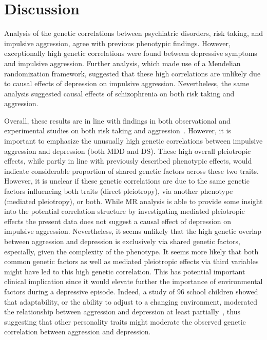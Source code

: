 \section{Discussion}
\label{sec:discussion_ukb_psych}

Analysis of the genetic correlations between psychiatric disorders, risk taking, and impulsive aggression, agree with previous phenotypic findings.
However, exceptionally high genetic correlations were found between depressive symptoms and impulsive aggression.
Further analysis, which made use of a Mendelian randomization framework, suggested that these high correlations are unlikely due to causal effects of depression on impulsive aggression.
Nevertheless, the same analysis suggested causal effects of schizophrenia on both risk taking and aggression. 

Overall, these results are in line with findings in both observational and experimental studies on both risk taking and aggression~\cite{Ballester2012,Ouzir2013,Hoptman2015,Sher2005,Roland2002,Taft2009, Dutton2013}.
However, it is important to emphasize the unusually high genetic correlations between impulsive aggression and depression (both MDD and DS).  
These high overall pleiotropic effects, while partly in line with previously described phenotypic effects, would indicate considerable proportion of shared genetic factors across these two traits.
However, it is unclear if these genetic correlations are due to the same genetic factors influencing both traits (direct pleiotropy), via another phenotype (mediated pleiotropy), or both.
While MR analysis is able to provide some insight into the potential correlation structure by investigating mediated pleiotropic effects the present data does not suggest a causal effect of depression on impulsive aggression.
Nevertheless, it seems unlikely that the high genetic overlap between aggression and depression is exclusively via shared genetic factors,
especially, given the complexity of the phenotype.
It seems more likely that both common genetic factors as well as mediated pleiotropic effects via third variables might have led to this high genetic correlation.
This has potential important clinical implication since it would elevate further the importance of environmental factors during a depressive episode.
Indeed, a study of 96 school children showed that adaptability, or the ability to adjust to a changing environment, moderated the relationship between aggression and depression at least partially~\cite{Lee2015a}, thus suggesting that other personality traits might moderate the observed genetic correlation between aggression and depression. 


